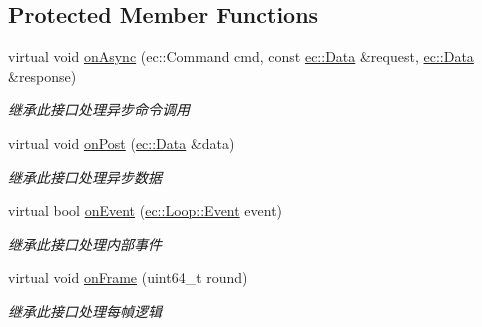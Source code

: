 \subsection*{Protected Member Functions}
\begin{DoxyCompactItemize}
\item 
\hypertarget{classec_1_1Loop_a2a40b87b2fa1cbb820692c8a10bed3ab}{virtual void \hyperlink{classec_1_1Loop_a2a40b87b2fa1cbb820692c8a10bed3ab}{on\-Async} (ec\-::\-Command cmd, const \hyperlink{classec_1_1Data}{ec\-::\-Data} \&request, \hyperlink{classec_1_1Data}{ec\-::\-Data} \&response)}\label{classec_1_1Loop_a2a40b87b2fa1cbb820692c8a10bed3ab}

\begin{DoxyCompactList}\small\item\em 继承此接口处理异步命令调用 \end{DoxyCompactList}\item 
\hypertarget{classec_1_1Loop_a3365009f41dd34e57c261485f0eb49cd}{virtual void \hyperlink{classec_1_1Loop_a3365009f41dd34e57c261485f0eb49cd}{on\-Post} (\hyperlink{classec_1_1Data}{ec\-::\-Data} \&data)}\label{classec_1_1Loop_a3365009f41dd34e57c261485f0eb49cd}

\begin{DoxyCompactList}\small\item\em 继承此接口处理异步数据 \end{DoxyCompactList}\item 
\hypertarget{classec_1_1Loop_a739a3679b5ca8d66dca537cb1df9c5c0}{virtual bool \hyperlink{classec_1_1Loop_a739a3679b5ca8d66dca537cb1df9c5c0}{on\-Event} (\hyperlink{classec_1_1Loop_ac861df4ad2e7779e31932b2171935f81}{ec\-::\-Loop\-::\-Event} event)}\label{classec_1_1Loop_a739a3679b5ca8d66dca537cb1df9c5c0}

\begin{DoxyCompactList}\small\item\em 继承此接口处理内部事件 \end{DoxyCompactList}\item 
\hypertarget{classec_1_1Loop_a4b904f427bf6568f216692997bd17e15}{virtual void \hyperlink{classec_1_1Loop_a4b904f427bf6568f216692997bd17e15}{on\-Frame} (uint64\-\_\-t round)}\label{classec_1_1Loop_a4b904f427bf6568f216692997bd17e15}

\begin{DoxyCompactList}\small\item\em 继承此接口处理每幀逻辑 \end{DoxyCompactList}\end{DoxyCompactItemize}


